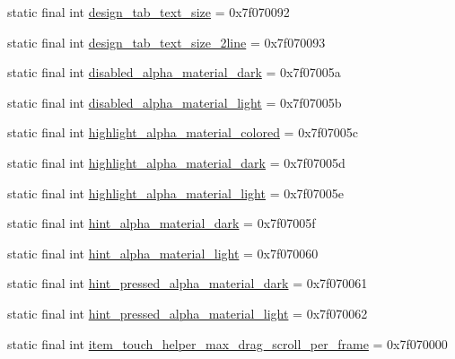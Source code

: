 \begin{CompactItemize}
\item 
static final int \hyperlink{classandroid_1_1support_1_1v7_1_1recyclerview_1_1_r_1_1dimen_350ae8d024b321ce165d9164aa7f1819}{design\_\-tab\_\-text\_\-size} = 0x7f070092
\item 
static final int \hyperlink{classandroid_1_1support_1_1v7_1_1recyclerview_1_1_r_1_1dimen_4e30662a29d9fc5d47856d5ed29e7dbc}{design\_\-tab\_\-text\_\-size\_\-2line} = 0x7f070093
\item 
static final int \hyperlink{classandroid_1_1support_1_1v7_1_1recyclerview_1_1_r_1_1dimen_c4f3784d3b4c9ef92a48648e16feebf0}{disabled\_\-alpha\_\-material\_\-dark} = 0x7f07005a
\item 
static final int \hyperlink{classandroid_1_1support_1_1v7_1_1recyclerview_1_1_r_1_1dimen_a0e7e59743e6231ceeca8ef971dabea5}{disabled\_\-alpha\_\-material\_\-light} = 0x7f07005b
\item 
static final int \hyperlink{classandroid_1_1support_1_1v7_1_1recyclerview_1_1_r_1_1dimen_b3658c98b7314944a7821e1b10a4696d}{highlight\_\-alpha\_\-material\_\-colored} = 0x7f07005c
\item 
static final int \hyperlink{classandroid_1_1support_1_1v7_1_1recyclerview_1_1_r_1_1dimen_ea80bf4a02b0c6108c227f60572fa01b}{highlight\_\-alpha\_\-material\_\-dark} = 0x7f07005d
\item 
static final int \hyperlink{classandroid_1_1support_1_1v7_1_1recyclerview_1_1_r_1_1dimen_76bf3558fb072fccd97b542f182292bd}{highlight\_\-alpha\_\-material\_\-light} = 0x7f07005e
\item 
static final int \hyperlink{classandroid_1_1support_1_1v7_1_1recyclerview_1_1_r_1_1dimen_0de9bc09026125b752dfffbc5ccb1777}{hint\_\-alpha\_\-material\_\-dark} = 0x7f07005f
\item 
static final int \hyperlink{classandroid_1_1support_1_1v7_1_1recyclerview_1_1_r_1_1dimen_6bcb837cbd629545d342d98bd01a22e7}{hint\_\-alpha\_\-material\_\-light} = 0x7f070060
\item 
static final int \hyperlink{classandroid_1_1support_1_1v7_1_1recyclerview_1_1_r_1_1dimen_745b0e41bd884aa52b74218abf8d0bdf}{hint\_\-pressed\_\-alpha\_\-material\_\-dark} = 0x7f070061
\item 
static final int \hyperlink{classandroid_1_1support_1_1v7_1_1recyclerview_1_1_r_1_1dimen_a289cd517ed3cd2c72ccb20db70209aa}{hint\_\-pressed\_\-alpha\_\-material\_\-light} = 0x7f070062
\item 
static final int \hyperlink{classandroid_1_1support_1_1v7_1_1recyclerview_1_1_r_1_1dimen_78bd98cf696b82b5aaf8eb83ef21c70a}{item\_\-touch\_\-helper\_\-max\_\-drag\_\-scroll\_\-per\_\-frame} = 0x7f070000

\end{CompactItemize}
